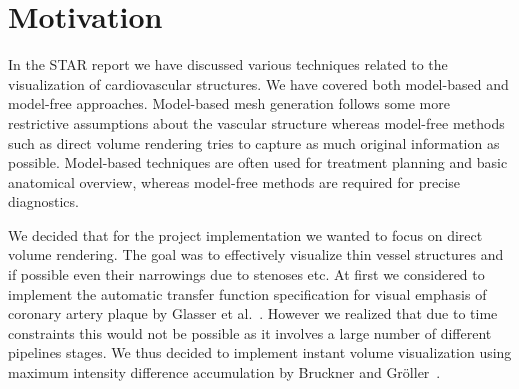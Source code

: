 \section{Motivation}

In the STAR report we have discussed various techniques related to the visualization of cardiovascular structures. We have covered both model-based and model-free approaches. Model-based mesh generation follows some more restrictive assumptions about the vascular structure whereas model-free methods such as direct volume rendering tries to capture as much original information as possible. Model-based techniques are often used for treatment planning and basic anatomical overview, whereas model-free methods are required for precise diagnostics.

We decided that for the project implementation we wanted to focus on direct volume rendering. The goal was to effectively visualize thin vessel structures and if possible even their narrowings due to stenoses etc. At first we considered to implement the automatic transfer function specification for visual emphasis of coronary artery plaque by Glasser et al.~\cite{glasser2010automatic}. However we realized that due to time constraints this would not be possible as it involves a large number of different pipelines stages. We thus decided to implement instant volume visualization using maximum intensity difference accumulation by Bruckner and Gr{\"o}ller~\cite{bruckner2009instant}.


